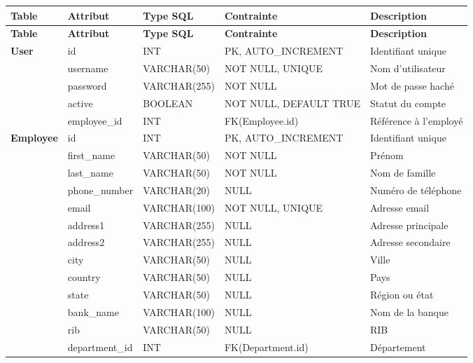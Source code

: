\begin{longtable}{|p{2.5cm}|p{3cm}|p{3cm}|p{3cm}|p{3cm}|}
    \hline
    \textbf{Table} & \textbf{Attribut} & \textbf{Type SQL} & \textbf{Contrainte} & \textbf{Description} \\
    \hline
    \endfirsthead

    \hline
    \textbf{Table} & \textbf{Attribut} & \textbf{Type SQL} & \textbf{Contrainte} & \textbf{Description} \\
    \hline
    \endhead

    \multirow{5}{*}{\textbf{User}} & id & INT & PK, AUTO\_INCREMENT & Identifiant unique \\
    \cline{2-5}
    & username & VARCHAR(50) & NOT NULL, UNIQUE & Nom d'utilisateur \\
    \cline{2-5}
    & password & VARCHAR(255) & NOT NULL & Mot de passe haché \\
    \cline{2-5}
    & active & BOOLEAN & NOT NULL, DEFAULT TRUE & Statut du compte \\
    \cline{2-5}
    & employee\_id & INT & FK(Employee.id) & Référence à l'employé \\
    \hline

    \multirow{12}{*}{\textbf{Employee}} & id & INT & PK, AUTO\_INCREMENT & Identifiant unique \\
    \cline{2-5}
    & first\_name & VARCHAR(50) & NOT NULL & Prénom \\
    \cline{2-5}
    & last\_name & VARCHAR(50) & NOT NULL & Nom de famille \\
    \cline{2-5}
    & phone\_number & VARCHAR(20) & NULL & Numéro de téléphone \\
    \cline{2-5}
    & email & VARCHAR(100) & NOT NULL, UNIQUE & Adresse email \\
    \cline{2-5}
    & address1 & VARCHAR(255) & NULL & Adresse principale \\
    \cline{2-5}
    & address2 & VARCHAR(255) & NULL & Adresse secondaire \\
    \cline{2-5}
    & city & VARCHAR(50) & NULL & Ville \\
    \cline{2-5}
    & country & VARCHAR(50) & NULL & Pays \\
    \cline{2-5}
    & state & VARCHAR(50) & NULL & Région ou état \\
    \cline{2-5}
    & bank\_name & VARCHAR(100) & NULL & Nom de la banque \\
    \cline{2-5}
    & rib & VARCHAR(50) & NULL & RIB \\
    \cline{2-5}
    & department\_id & INT & FK(Department.id) & Département \\
    \hline


\end{longtable}
